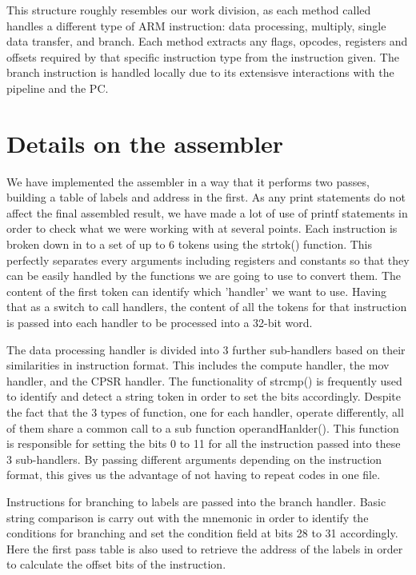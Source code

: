 \documentclass[11pt]{article}
\begin{document}
\medskip

This structure roughly resembles our work division, as each method called handles a different type of ARM instruction: data processing, multiply, single data transfer, and branch. Each method extracts any flags, opcodes, registers and offsets required by that specific instruction type from the instruction given. The branch instruction is handled locally due to its extensisve interactions with the pipeline and the PC.

\section{Details on the assembler}

We have implemented the assembler in a way that it performs two passes, building a table of labels and address in the first. As any print statements do not affect the final assembled result, we have made a lot of use of printf statements in order to check what we were working with at several points. Each instruction is broken down in to a set of up to 6 tokens using the strtok() function. This perfectly separates every arguments including registers and constants so that they can be easily handled by the functions we are going to use to convert them. The content of the first token can identify which 'handler' we want to use. Having that as a switch to call handlers, the content of all the tokens for that instruction is passed into each handler to be processed into a 32-bit word.

\medskip

The data processing handler is divided into 3 further sub-handlers based on their similarities in instruction format. This includes the compute handler, the mov handler, and the CPSR handler. The functionality of strcmp() is frequently used to identify and detect a string token in order to set the bits accordingly.  Despite the fact that the 3 types of function, one for each handler, operate differently, all of them share a common call to a sub function operandHanlder(). This function is responsible for setting the bits 0 to 11 for all the instruction passed into these 3 sub-handlers. By passing different arguments depending on the instruction format, this gives us the advantage of not having to repeat codes in one file. 

\medskip

Instructions for branching to labels are passed into the branch handler. Basic string comparison is carry out with the mnemonic in order to identify the conditions for branching and set the condition field at bits 28 to 31 accordingly. Here the first pass table is also used to retrieve the address of the labels in order to calculate the offset bits of the instruction.
\end{document}
